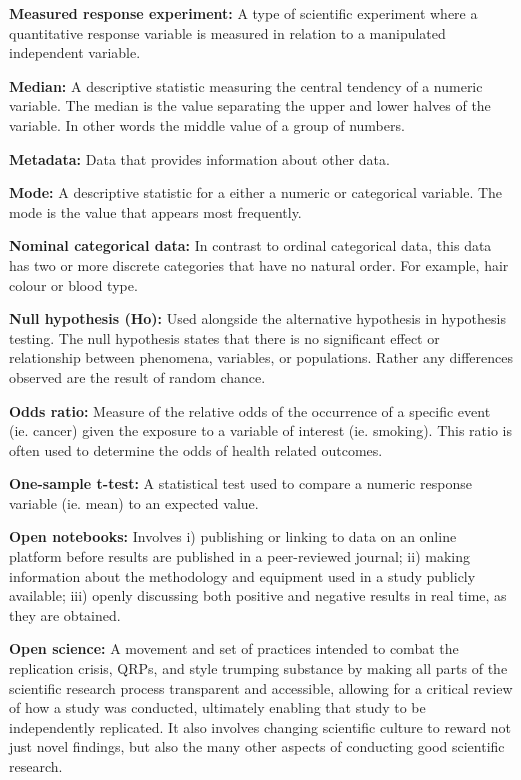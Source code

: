 \documentclass[
]{book}
\begin{document}
\textbf{Measured response experiment:} A type of scientific experiment where a quantitative response variable is measured in relation to a manipulated independent variable.

\textbf{Median:} A descriptive statistic measuring the central tendency of a numeric variable. The median is the value separating the upper and lower halves of the variable. In other words the middle value of a group of numbers.

\textbf{Metadata:} Data that provides information about other data.

\textbf{Mode:} A descriptive statistic for a either a numeric or categorical variable. The mode is the value that appears most frequently.

\textbf{Nominal categorical data:} In contrast to ordinal categorical data, this data has two or more discrete categories that have no natural order. For example, hair colour or blood type.

\textbf{Null hypothesis (Ho):} Used alongside the alternative hypothesis in hypothesis testing. The null hypothesis states that there is no significant effect or relationship between phenomena, variables, or populations. Rather any differences observed are the result of random chance.

\textbf{Odds ratio:} Measure of the relative odds of the occurrence of a specific event (ie. cancer) given the exposure to a variable of interest (ie. smoking). This ratio is often used to determine the odds of health related outcomes.

\textbf{One-sample t-test:} A statistical test used to compare a numeric response variable (ie. mean) to an expected value.

\textbf{Open notebooks:} Involves i) publishing or linking to data on an online platform before results are published in a peer-reviewed journal; ii) making information about the methodology and equipment used in a study publicly available; iii) openly discussing both positive and negative results in real time, as they are obtained.

\textbf{Open science:} A movement and set of practices intended to combat the replication crisis, QRPs, and style trumping substance by making all parts of the scientific research process transparent and accessible, allowing for a critical review of how a study was conducted, ultimately enabling that study to be independently replicated. It also involves changing scientific culture to reward not just novel findings, but also the many other aspects of conducting good scientific research.
\end{document}
